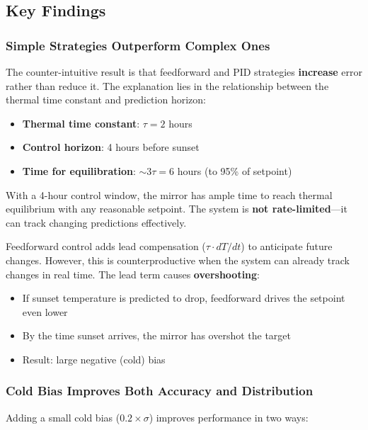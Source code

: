 \documentclass[11pt,letterpaper]{article}
\begin{document}
\subsection{Key Findings}

\subsubsection{Simple Strategies Outperform Complex Ones}

The counter-intuitive result is that feedforward and PID strategies \textbf{increase} error rather than reduce it. The explanation lies in the relationship between the thermal time constant and prediction horizon:

\begin{itemize}
    \item \textbf{Thermal time constant}: $\tau = 2$ hours
    \item \textbf{Control horizon}: 4 hours before sunset
    \item \textbf{Time for equilibration}: $\sim 3\tau = 6$ hours (to 95\% of setpoint)
\end{itemize}

With a 4-hour control window, the mirror has ample time to reach thermal equilibrium with any reasonable setpoint. The system is \textbf{not rate-limited}---it can track changing predictions effectively.

Feedforward control adds lead compensation ($\tau \cdot dT/dt$) to anticipate future changes. However, this is counterproductive when the system can already track changes in real time. The lead term causes \textbf{overshooting}:

\begin{itemize}
    \item If sunset temperature is predicted to drop, feedforward drives the setpoint even lower
    \item By the time sunset arrives, the mirror has overshot the target
    \item Result: large negative (cold) bias
\end{itemize}

\subsubsection{Cold Bias Improves Both Accuracy and Distribution}

Adding a small cold bias ($0.2 \times \sigma$) improves performance in two ways:
\end{document}
